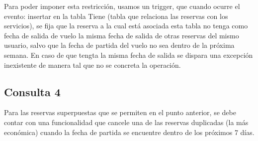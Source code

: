 Para poder imponer esta restricción, usamos un trigger, que cuando ocurre el evento: 
insertar en la tabla Tiene (tabla que relaciona las reservas con los servicios), se fija
que la reserva a la cual está asociada esta tabla no tenga como fecha de salida de vuelo
la misma fecha de salida de otras reservas del mismo usuario, salvo que la fecha de partida
del vuelo no sea dentro de la próxima semana. En caso de que tengta la misma fecha de salida
se dispara una excepción inexistente de manera tal que no se concreta la operación.

\newpage

\subsection*{Consulta 4}

Para las reservas superpuestas que se permiten en el punto anterior, se debe contar con una
funcionalidad que cancele una de las reservas duplicadas (la más económica) cuando la
fecha de partida se encuentre dentro de los próximos 7 días.


\begin{small}
\begin{verbatimtab}[2]

\end{verbatimtab}
\end{small}
